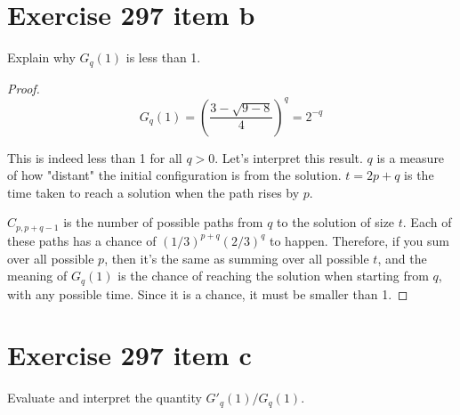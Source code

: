 \documentclass[10pt]{book}
\begin{document}
\section{Exercise 297 item b}

Explain why $G_q(1)$ is less than 1.

\begin{proof}
$$G_q(1)=\left(\frac{3-\sqrt{9-8}}{4}\right)^q=2^{-q}$$

This is indeed less than 1 for all $q>0$. Let's interpret this result. $q$ is a measure of how "distant" the initial configuration is from the solution. $t=2p+q$ is the time taken to reach a solution when the path rises by $p$. 

$C_{p,p+q-1}$ is the number of possible paths from $q$ to the solution of size $t$. Each of these paths has a chance of $(1/3)^{p+q}(2/3)^q$ to happen. Therefore, if you sum over all possible $p$, then it's the same as summing over all possible $t$, and the meaning of $G_q(1)$ is the chance of reaching the solution when starting from $q$, with any possible time. Since it is a chance, it must be smaller than 1.

\end{proof}

\section{Exercise 297 item c}

Evaluate and interpret the quantity $G'_q(1)/G_q(1)$.
\end{document}
